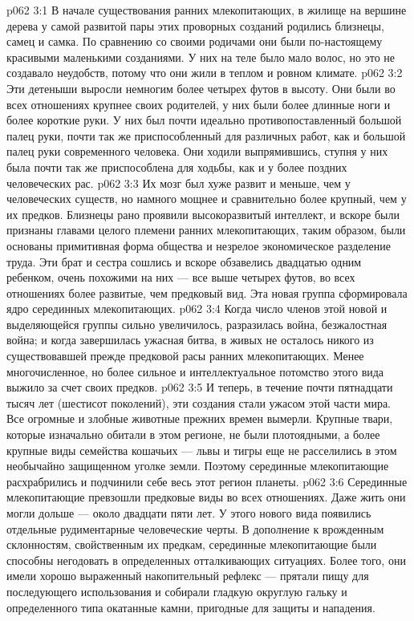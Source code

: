 \vs p062 3:1 В начале существования ранних млекопитающих, в жилище на вершине дерева у самой развитой пары этих проворных созданий родились близнецы, самец и самка. По сравнению со своими родичами они были по\hyp{}настоящему красивыми маленькими созданиями. У них на теле было мало волос, но это не создавало неудобств, потому что они жили в теплом и ровном климате.
\vs p062 3:2 Эти детеныши выросли немногим более четырех футов в высоту. Они были во всех отношениях крупнее своих родителей, у них были более длинные ноги и более короткие руки. У них был почти идеально противопоставленный большой палец руки, почти так же приспособленный для различных работ, как и большой палец руки современного человека. Они ходили выпрямившись, ступня у них была почти так же приспособлена для ходьбы, как и у более поздних человеческих рас.
\vs p062 3:3 Их мозг был хуже развит и меньше, чем у человеческих существ, но намного мощнее и сравнительно более крупный, чем у их предков. Близнецы рано проявили высокоразвитый интеллект, и вскоре были признаны главами целого племени ранних млекопитающих, таким образом, были основаны примитивная форма общества и незрелое экономическое разделение труда. Эти брат и сестра сошлись и вскоре обзавелись двадцатью одним ребенком, очень похожими на них --- все выше четырех футов, во всех отношениях более развитые, чем предковый вид. Эта новая группа сформировала ядро серединных млекопитающих.
\vs p062 3:4 Когда число членов этой новой и выделяющейся группы сильно увеличилось, разразилась война, безжалостная война; и когда завершилась ужасная битва, в живых не осталось никого из существовавшей прежде предковой расы ранних млекопитающих. Менее многочисленное, но более сильное и интеллектуальное потомство этого вида выжило за счет своих предков.
\vs p062 3:5 И теперь, в течение почти пятнадцати тысяч лет (шестисот поколений), эти создания стали ужасом этой части мира. Все огромные и злобные животные прежних времен вымерли. Крупные твари, которые изначально обитали в этом регионе, не были плотоядными, а более крупные виды семейства кошачьих --- львы и тигры еще не расселились в этом необычайно защищенном уголке земли. Поэтому серединные млекопитающие расхрабрились и подчинили себе весь этот регион планеты.
\vs p062 3:6 \pc Серединные млекопитающие превзошли предковые виды во всех отношениях. Даже жить они могли дольше --- около двадцати пяти лет. У этого нового вида появились отдельные рудиментарные человеческие черты. В дополнение к врожденным склонностям, свойственным их предкам, серединные млекопитающие были способны негодовать в определенных отталкивающих ситуациях. Более того, они имели хорошо выраженный накопительный рефлекс --- прятали пищу для последующего использования и собирали гладкую округлую гальку и определенного типа окатанные камни, пригодные для защиты и нападения.
